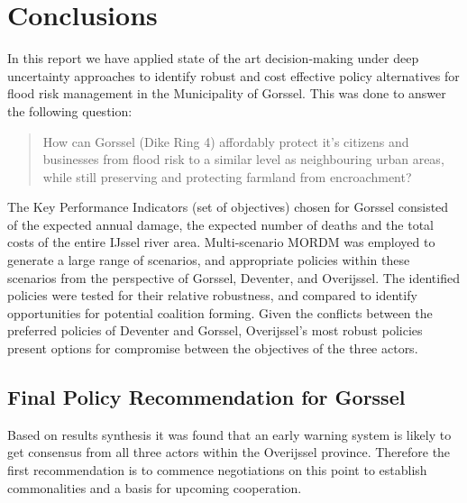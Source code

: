 \section{Conclusions}
\label{s:conc}


In this report we have applied state of the art decision-making under deep uncertainty approaches to identify robust and cost effective policy alternatives for flood risk management in the Municipality of Gorssel. This was done to answer the following question:
\begin{quote}
    How can Gorssel (Dike Ring 4) affordably protect it's citizens and businesses from flood risk to a similar level as neighbouring urban areas, while still preserving and protecting farmland from encroachment?
\end{quote} 

The Key Performance Indicators (set of objectives) chosen for Gorssel consisted of the expected annual damage, the expected number of deaths and the total costs of the entire IJssel river area. Multi-scenario MORDM was employed to generate a large range of scenarios, and appropriate policies within these scenarios from the perspective of Gorssel, Deventer, and Overijssel. The identified policies were tested for their relative robustness, and compared to identify opportunities for potential coalition forming. Given the conflicts between the preferred policies of Deventer and Gorssel, Overijssel's most robust policies present options for compromise between the objectives of the three actors.

\subsection{Final Policy Recommendation for Gorssel}
Based on results synthesis it was found that an early warning system is likely to get consensus from all three actors within the Overijssel province. Therefore the first recommendation is to commence negotiations on this point to establish commonalities and a basis for upcoming cooperation.

